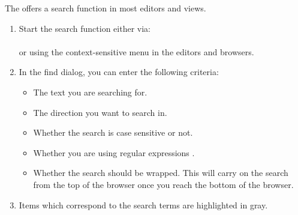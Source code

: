 
The \ite{} offers a search function in most editors and views. 
\begin{enumerate}
\item Start the search function either via:\\
\\
or using the context-sensitive menu in the editors and browsers.
\item In the find dialog, you can enter the following criteria:
\begin{itemize}
\item The text you are searching for.
\item The direction you want to search in.
\item Whether the search is case sensitive or not.
\item Whether you are using regular expressions . 
\item Whether the search should be wrapped. This will carry on the search from the top of the browser once you reach the bottom of the browser.
\end{itemize}
\item Items which correspond to the search terms are highlighted in gray. 

\end{enumerate}
